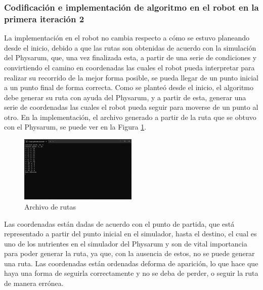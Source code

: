 \subsubsection{Codificaci\'on e implementaci\'on de algoritmo en el robot en la primera iteraci\'on 2}
    La implementaci\'on en el robot no cambia respecto a c\'omo se
        estuvo planeando desde el inicio, debido a que las rutas son
        obtenidas de acuerdo con la simulaci\'on del Physarum, que,
        una vez finalizada esta, a partir de una serie de condiciones y
        convirtiendo el camino en coordenadas las cuales el robot
        pueda interpretar para realizar su recorrido de la mejor forma
        posible, se pueda llegar de un punto inicial a un punto final
        de forma correcta.
        \vskip 0.5cm
    Como se plante\'o desde el inicio, el algoritmo debe generar
        su ruta con ayuda del Physarum, y a partir de esta, generar
        una serie de coordenadas las cuales el robot pueda seguir
        para moverse de un punto al otro. En la implementaci\'on, el
        archivo generado a partir de la ruta que se obtuvo con el
        Physarum, se puede ver en la Figura \ref{fig:Archivoderutas01}.
    \vskip 0.5cm
    \begin{figure}[htbp]
        \centering
        \includegraphics[width=0.5\textwidth]{./images/Pruebas/simulador/image043.png}
        \caption{Archivo de rutas}
        \label{fig:Archivoderutas01}
    \end{figure}
    \vskip 0.5cm
    Las coordenadas est\'an dadas de acuerdo con el punto de
        partida, que est\'a representado a partir del punto inicial en el
        simulador, hasta el destino, el cual es uno de los nutrientes
        en el simulador del Physarum y son de vital importancia para
        poder generar la ruta, ya que, con la ausencia de estos, no se
        puede generar una ruta. Las coordenadas est\'an ordenadas deforma de aparici\'on, lo que hace que haya una forma de
        seguirla correctamente y no se deba de perder, o seguir la
        ruta de manera err\'onea.